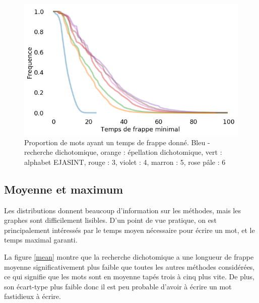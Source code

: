 \documentclass[twoside,twocolumn]{article}
\begin{document}
\begin{center}
\begin{figure}
  \includegraphics[scale=0.35]{frappe-mini.png}
  \caption{Proportion de mots ayant un temps de frappe donné. Bleu - recherche dichotomique, orange : épellation dichotomique, vert : alphabet EJASINT, rouge : 3, violet : 4, marron : 5, rose pâle : 6}
  \label{frappe-mini}
\end{figure}
\end{center}

\subsection{Moyenne et maximum}

Les distributions donnent beaucoup d'information sur les méthodes, mais les graphes sont difficilement lisibles. D'un point de vue pratique, on est principalement intéressés par le temps moyen nécessaire pour écrire un mot, et le temps maximal garanti.

La figure \ref{mean} montre que la recherche dichotomique a une longueur de frappe moyenne significativement plus faible que toutes les autres méthodes considérées, ce qui signifie que les mots sont en moyenne tapés trois à cinq plus vite. De plus, son écart-type plus faible donc il est peu probable d'avoir à écrire un mot fastidieux à écrire.
\end{document}
